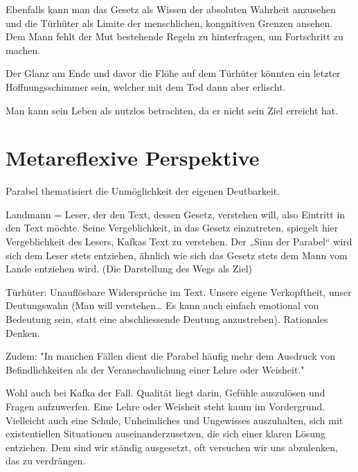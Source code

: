 \documentclass{article}
\begin{document}
Ebenfalls kann man das Gesetz als Wissen der absoluten Wahrheit anzusehen und die Türhüter als Limite der menschlichen, kongnitiven Grenzen ansehen. Dem Mann fehlt der Mut bestehende Regeln zu hinterfragen, um Fortschritt zu machen.

Der Glanz am Ende und davor die Flöhe auf dem Türhüter könnten ein letzter Hoffnungsschimmer sein, welcher mit dem Tod dann aber erlischt.

Man kann sein Leben als nutzlos betrachten, da er nicht sein Ziel erreicht hat.

\section{Metareflexive Perspektive}
Parabel thematisiert die Unmöglichkeit der eigenen Deutbarkeit. 

Landmann = Leser, der den Text, dessen Gesetz, verstehen will, also Eintritt in den Text möchte. Seine Vergeblichkeit, in das Gesetz einzutreten, spiegelt hier Vergeblichkeit des Lesers, Kafkas Text zu verstehen. Der „Sinn der Parabel“ wird sich dem Leser stets entziehen, ähnlich wie sich das Gesetz stets dem Mann vom Lande entziehen wird. (Die Darstellung des Wegs als Ziel)

Türhüter: Unauflösbare Widersprüche im Text. Unsere eigene Verkopftheit, unser Deutungswahn (Man will verstehen… Es kann auch einfach emotional von Bedeutung sein, statt eine abschliessende Deutung anzustreben). Rationales Denken.
 
Zudem: "In manchen Fällen dient die Parabel häufig mehr dem Ausdruck von Befindlichkeiten als der Veranschaulichung einer Lehre oder Weisheit." 
 
Wohl auch bei Kafka der Fall. Qualität liegt darin, Gefühle auszulösen und Fragen aufzuwerfen. Eine Lehre oder Weisheit steht kaum im Vordergrund. Vielleicht auch eine Schule, Unheimliches und Ungewisses auszuhalten, sich mit existentiellen Situationen auseinanderzusetzen, die sich einer klaren Lösung entziehen. Dem sind wir ständig ausgesetzt, oft versuchen wir uns abzulenken, das zu verdrängen.
\end{document}

